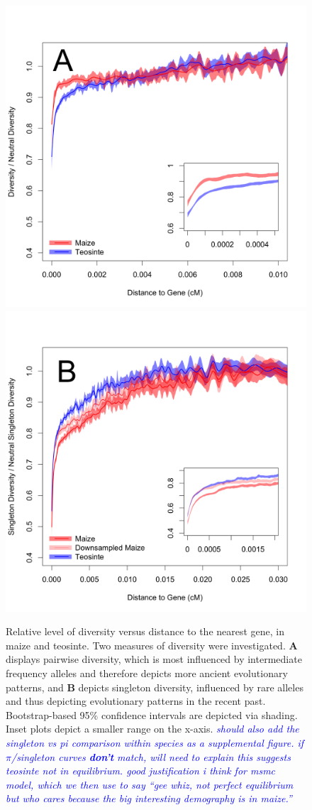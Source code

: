 \documentclass{pnastwo}
\newcommand{\jri}[1]{\textcolor{blue}{\emph{#1}} }
\begin{document}
\begin{article}
\begin{figure}[t]
\centering
\includegraphics[width=.45\textwidth]{FigsAndFiles/distanceToGene_WithSignificance_Folded2_manuscript.png} \includegraphics[width=.45\textwidth]{FigsAndFiles/distanceToGene_WithSignificance_Singletons_Downsampled_threeLines_manuscript.png}
\caption{Relative level of diversity versus distance to the nearest
  gene, in maize and teosinte. Two measures of diversity were
  investigated. \textbf{A} displays pairwise
  diversity, which is most influenced by intermediate frequency
  alleles and therefore depicts more ancient evolutionary patterns,
  and \textbf{B} depicts singleton diversity, influenced by rare
  alleles and thus depicting evolutionary patterns in the recent
  past. Bootstrap-based 95\% confidence intervals are depicted via shading. Inset plots depict a smaller range on the x-axis. \label{fig:purify} \jri{should also add the singleton vs pi comparison within species as a supplemental figure. if $\pi$/singleton curves {\bf don't} match, will need to explain this suggests teosinte not in equilibrium.  good justification i think for msmc model, which we then use to say ``gee whiz, not perfect equilibrium but who cares because the big interesting demography is in maize.'' }}
\end{figure}



\end{article}
\end{document}
